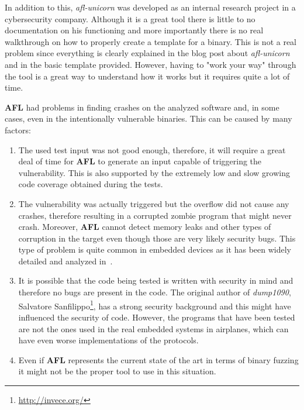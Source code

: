 \documentclass[../main.tex]{subfiles}
\begin{document}
In addition to this, \textit{afl-unicorn} was developed as an internal research project in a cybersecurity company. Although it is a great tool there is little to no documentation on his functioning and more importantly there is no real walkthrough on how to properly create a template for a binary. This is not a real problem since everything is clearly explained in the blog post about \textit{afl-unicorn} and in the basic template provided. However, having to "work your way" through the tool is a great way to understand how it works but it requires quite a lot of time.

\textbf{AFL} had problems in finding crashes on the analyzed software and, in some cases, even in the intentionally vulnerable binaries. This can be caused by many factors:

\begin{enumerate}

  \item The used test input was not good enough, therefore, it will require a great deal of time for \textbf{AFL} to generate an input capable of triggering the vulnerability. This is also supported by the extremely low and slow growing code coverage obtained during the tests.

  \item The vulnerability was actually triggered but the overflow did not cause any crashes, therefore resulting in a corrupted zombie program that might
  never crash. Moreover, \textbf{AFL} cannot detect memory leaks and other types of corruption in the target even though those are very likely security bugs.
  This type of problem is quite common in embedded devices as it has been widely detailed and analyzed in~\cite{corrcrash}.

  \item It is possible that the code being tested is written with security in   mind and therefore no bugs are present in the code. The original author of
  \textit{dump1090}, Salvatore Sanfilippo\footnote{\url{http://invece.org/}}, has a strong security background and this might have influenced the security of code. However, the programs that have been tested are not the ones used in the real embedded systems in airplanes, which can have even worse implementations of the protocols.

  \item Even if \textbf{AFL} represents the current state of the art in terms of binary fuzzing it might not be the proper tool to use in this situation.

\end{enumerate}
\end{document}

